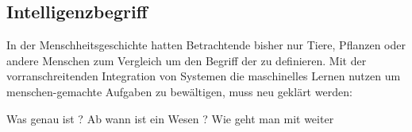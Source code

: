 \documentclass[12pt]{report}
\begin{document}
    \subsection{Intelligenzbegriff}
    In der Menschheitsgeschichte hatten Betrachtende bisher nur Tiere, Pflanzen oder andere Menschen zum Vergleich
    um den Begriff der  zu definieren. Mit der vorranschreitenden Integration von Systemen die maschinelles
    Lernen nutzen um menschen-gemachte Aufgaben zu bewältigen, muss neu geklärt werden:
        \begin{displayquote}
            Was genau ist ?
            Ab wann ist ein Wesen ?
            Wie geht man mit weiter
        \end{displayquote}
\end{document}
